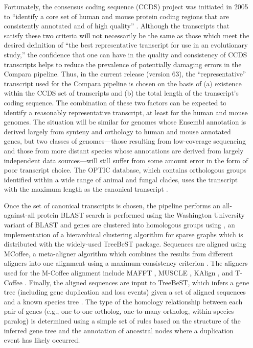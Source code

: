Fortunately, the consensus coding sequence (CCDS) project was
initiated in 2005 to ``identify a core set of human and mouse protein
coding regions that are consistently annotated and of high quality''
\citep{Pruitt2009}. Although the transcripts that satisfy these two
criteria will not necessarily be the same as those which meet the
desired definition of ``the best representative transcript for use in
an evolutionary study,'' the confidence that one can have in the
quality and consistency of CCDS transcripts helps to reduce the
prevalence of potentially damaging errors in the Compara pipeline.
Thus, in the current release (version 63), the ``representative''
transcript used for the Compara pipeline is chosen on the basis of (a)
existence within the CCDS set of transcripts and (b) the total length
of the transcript's coding sequence. The combination of these two
factors can be expected to identify a reasonably representative
transcript, at least for the human and mouse genomes. The situation
will be similar for genomes whose Ensembl annotation is derived
largely from synteny and orthology to human and mouse annotated genes,
but two classes of genomes---those resulting from low-coverage
sequencing and those from more distant species whose annotations are
derived from largely independent data sources---will still suffer from
some amount error in the form of poor transcript choice. The OPTIC
database, which contains orthologous groups identified within a wide
range of animal and fungal clades, uses the transcript with the
maximum length as the canonical transcript \citep{Heger2008}.

Once the set of canonical transcripts is chosen, the \cmp pipeline
performs an all-against-all protein BLAST search is performed using
the Washington University variant of BLAST \citep{Chao1992} and genes
are clustered into homologous groups using \hclust \citep{Ruan2008},
an implementation of a hierarchical clustering algorithm for sparse
graphs which is distributed with the widely-used TreeBeST
package. Sequences are aligned using MCoffee, a meta-aligner algorithm
which combines the results from different aligners into one alignment
using a maximum-consistency criterion \citep{Wallace2006}. The
aligners used for the M-Coffee alignment include MAFFT
\citep{Katoh2005}, MUSCLE \citep{Edgar2004}, KAlign
\citep{Lassmann2009}, and T-Coffee \citep{Notredame2000}. Finally, the
aligned sequences are input to TreeBeST, which infers a gene tree
(including gene duplication and loss events) given a set of aligned
sequences and a known species tree \citep{Ruan2008}. The type of the
homology relationship between each pair of genes (e.g., one-to-one
ortholog, one-to-many ortholog, within-species paralog) is determined
using a simple set of rules based on the structure of the inferred
gene tree and the annotation of ancestral nodes where a duplication
event has likely occurred.

